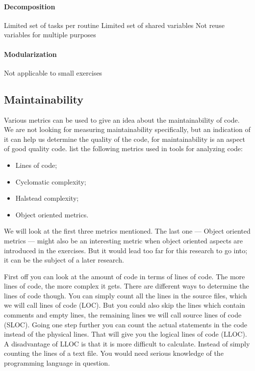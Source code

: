 \paragraph{Decomposition}
Limited set of tasks per routine
Limited set of shared variables
Not reuse variables for multiple purposes

\paragraph{Modularization}
Not applicable to small exercises

\subsection{Maintainability}

Various metrics can be used to give an idea
about the \gls{maintainability} of \gls{code}.
We are not looking for measuring \gls{maintainability} specifically,
but an indication of it can help us determine the quality of the \gls{code},
for \gls{maintainability} is an aspect of good quality \gls{code}.
\citet{rakic2013problems} list the following metrics
used in tools for analyzing \gls{code}:
\begin{itemize}
  \item Lines of code;
  \item Cyclomatic complexity;
  \item Halstead complexity;
  \item Object oriented metrics.
\end{itemize}
We will look at the first three metrics mentioned. The last one --- Object
oriented metrics --- might also be an interesting metric when object oriented
aspects are introduced in the \glspl{exercise}.
But it would lead too far for this research to go into;
it can be the subject of a later research.

First off you can look at the amount of \gls{code}
in terms of lines of \gls{code}.
The more lines of \gls{code}, the more complex it gets.
There are different ways to determine the lines of \gls{code} though.
You can simply count all the lines in the source files,
which we will call lines of code (LOC).
But you could also skip the lines which contain comments and empty lines,
the remaining lines we will call source lines of code (SLOC).
Going one step further you can count the actual statements in the \gls{code}
instead of the physical lines.
That will give you the logical lines of code (LLOC).
A disadvantage of LLOC is that it is more difficult to calculate.
Instead of simply counting the lines of a text file.
You would need serious knowledge of the programming language in question.


